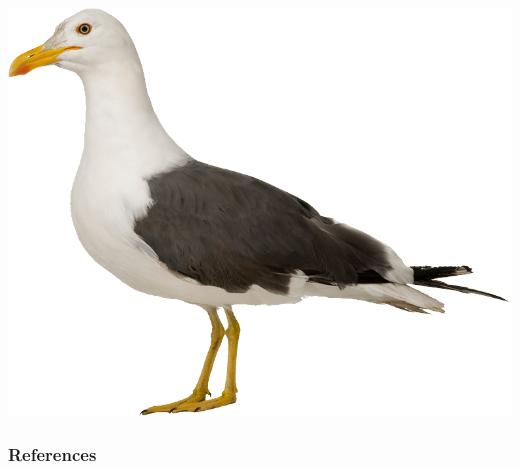 \documentclass{technical_presentation}
\begin{document}
\begin{frame}[plain]
	\centering
	\includegraphics[height=\textheight]{figures/gull}
\end{frame}
  



\appendix

\begin{frame}[allowframebreaks]
	\frametitle{References}
	\printbibliography[heading=bibintoc]
\end{frame}
\end{document}
